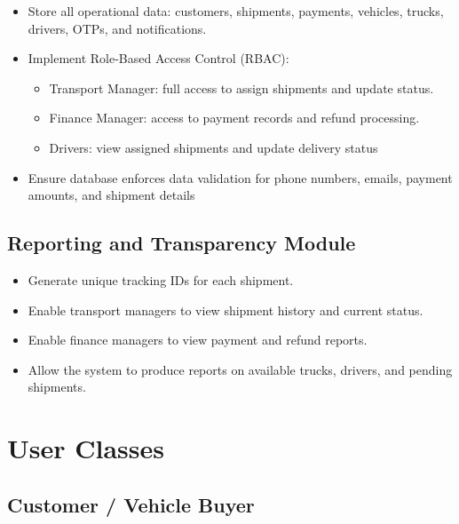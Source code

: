 \documentclass[12pt,a4paper]{article}
\begin{document}
\begin{itemize}

\item Store all operational data: customers, shipments, payments, vehicles, trucks, drivers, OTPs, and notifications.
\item Implement Role-Based Access Control (RBAC):


    \begin{itemize}
    \item Transport Manager: full access to assign shipments and update status.
    \item Finance Manager: access to payment records and refund processing.
    \item Drivers: view assigned shipments and update delivery status

    \end{itemize}
\item  Ensure database enforces data validation for phone numbers, emails, payment amounts, and shipment details
\end{itemize}

\subsection{Reporting and Transparency Module}

\begin{itemize}

\item Generate unique tracking IDs for each shipment.
\item Enable transport managers to view shipment history and current status.
\item Enable finance managers to view payment and refund reports.
\item Allow the system to produce reports on available trucks, drivers, and pending shipments.


\end{itemize}


\section{User Classes}

\subsection{Customer / Vehicle Buyer}
\end{document}
